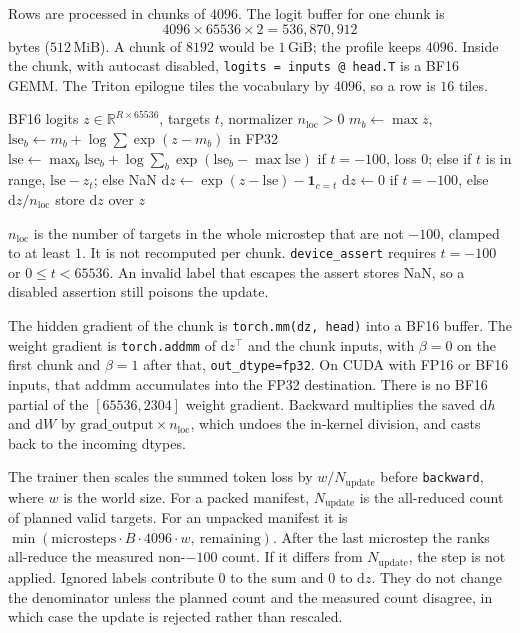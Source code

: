 \documentclass[11pt]{article}
\DeclareRobustCommand{\code}[1]{\texttt{#1}}
\newcommand{\MiB}{\,\mathrm{MiB}}
\newcommand{\GiB}{\,\mathrm{GiB}}
\begin{document}
Rows are processed in chunks of \(4096\). The logit buffer for one chunk is
\begin{equation}
4096\times 65536\times 2 = 536{,}870{,}912
\end{equation}
bytes (\(512\MiB\)). A chunk of \(8192\) would be \(1\GiB\); the profile
keeps \(4096\). Inside the chunk, with autocast disabled,
\code{logits = inputs @ head.T} is a BF16 GEMM. The Triton epilogue tiles the
vocabulary by \(4096\), so a row is \(16\) tiles.

\begin{algorithm}[t]
\caption{In-place chunk cross-entropy. The logit buffer is overwritten by \(\partial \ell/\partial z\).}
\label{alg:ce}
\begin{algorithmic}[1]
\Require BF16 logits \(z\in\mathbb{R}^{R\times 65536}\), targets \(t\), normalizer \(n_{\mathrm{loc}}>0\)
  \State \(m_b \leftarrow \max z\), \quad \(\mathrm{lse}_b \leftarrow m_b+\log\sum\exp(z-m_b)\) in FP32
\EndFor
\State \(\mathrm{lse}\leftarrow \max_b \mathrm{lse}_b+\log\sum_b\exp(\mathrm{lse}_b-\max \mathrm{lse})\)
\State if \(t=-100\), loss \(0\); else if \(t\) is in range, \(\mathrm{lse}-z_t\); else NaN
\State \(\mathrm{d}z \leftarrow \exp(z-\mathrm{lse})-\mathbf{1}_{c=t}\)
\State \(\mathrm{d}z \leftarrow 0\) if \(t=-100\), else \(\mathrm{d}z/n_{\mathrm{loc}}\)
\State store \(\mathrm{d}z\) over \(z\)
\end{algorithmic}
\end{algorithm}

\(n_{\mathrm{loc}}\) is the number of targets in the whole microstep that are
not \(-100\), clamped to at least \(1\). It is not recomputed per chunk.
\code{device\_assert} requires \(t=-100\) or \(0\le t<65536\). An invalid
label that escapes the assert stores NaN, so a disabled assertion still
poisons the update.

The hidden gradient of the chunk is \code{torch.mm(dz, head)} into a BF16
buffer. The weight gradient is \code{torch.addmm} of \(\mathrm{d}z^{\top}\)
and the chunk inputs, with \(\beta=0\) on the first chunk and \(\beta=1\)
after that, \code{out\_dtype=fp32}. On CUDA with FP16 or BF16 inputs, that
addmm accumulates into the FP32 destination. There is no BF16 partial of the
\([65536,2304]\) weight gradient. Backward multiplies the saved
\(\mathrm{d}h\) and \(\mathrm{d}W\) by \(\mathrm{grad\_output}\times n_{\mathrm{loc}}\),
which undoes the in-kernel division, and casts back to the incoming dtypes.

The trainer then scales the summed token loss by
\(w/N_{\mathrm{update}}\) before \code{backward}, where \(w\) is the world
size. For a packed manifest, \(N_{\mathrm{update}}\) is the all-reduced count
of planned valid targets. For an unpacked manifest it is
\(\min(\mathrm{microsteps}\cdot B\cdot 4096\cdot w,\ \mathrm{remaining})\).
After the last microstep the ranks all-reduce the measured non-\(-100\)
count. If it differs from \(N_{\mathrm{update}}\), the step is not applied.
Ignored labels contribute \(0\) to the sum and \(0\) to \(\mathrm{d}z\).
They do not change the denominator unless the planned count and the measured
count disagree, in which case the update is rejected rather than rescaled.
\end{document}
